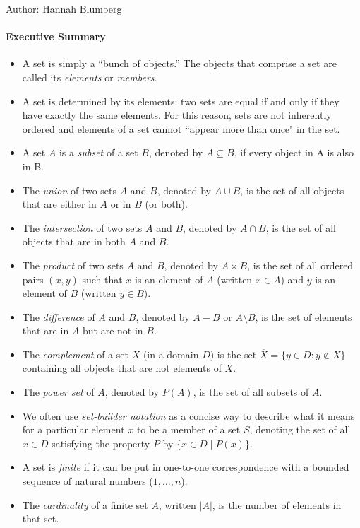 \documentclass[solution, letterpaper]{cs20inclass}
\begin{document}

\noindent Author: Hannah Blumberg

\paragraph*{Executive Summary}

\begin{itemize}
  \item A set is simply a ``bunch of objects.'' The objects that comprise a set are called its {\it elements} or {\it members}.
  \item A set is determined by its elements: two sets are equal if and only if they have exactly the same elements. For this reason, sets are not inherently ordered and elements of a set cannot ``appear more than once" in the set.
  \item A set $A$ is a {\em subset} of a set $B$, denoted by $A \subseteq B$, if every object in A is also in B.
  \item The {\em union} of two sets $A$ and $B$, denoted by $A\cup B$, is the set of all objects that are either in $A$ or in $B$ (or both).
  \item The {\em intersection} of two sets $A$ and $B$, denoted by $A \cap B$, is the set of all objects that are in both $A$ and $B$.
  \item The {\em product} of two sets $A$ and $B$, denoted by $A\times B$, is the set of all ordered pairs $(x,y)$ such that $x$ is an element of $A$ (written $x \in A$) and $y$ is an element of $B$ (written $y \in B$).
  \item The {\em difference} of $A$ and $B$, denoted by $A-B$ or $A\setminus B$, is the set of elements that are in $A$ but are not in $B$.
  \item The {\em complement} of a set $X$ (in a domain $D$) is the set $\overline X = \{y \in D : y \notin X\}$ containing all objects that are not elements of $X$.
  \item The {\em power set} of $A$, denoted by $P(A)$, is the set of all subsets of $A$.
  \item We often use {\em set-builder notation} as a concise way to describe what it means for a particular element $x$ to be a member of a set $S$, denoting the set of all $x\in D$ satisfying the property $P$ by $\{x\in D\mid P(x)\}$.
  \item A set is {\em finite} if it can be put in one-to-one correspondence with a bounded sequence of natural numbers ($1,\dots,n$). 
  \item The {\em cardinality} of a finite set $A$, written $|A|$, is the number of elements in that set.
\end{itemize}
\end{document}
